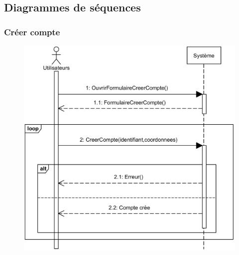 \subsection[Diagrammes de séquences]{Diagrammes de séquences}
    \subsubsection[Créer compte]{Créer compte}
        \begin{figure}[H]
            \centering
            \includegraphics[width=130mm]{images/sd-creer-compte.png}
            \label{fig:sdCreerCompte}
        \end{figure}
\pagebreak
